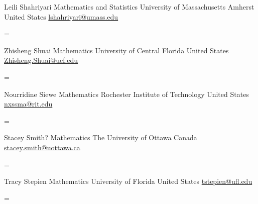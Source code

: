 \documentclass[
  letterpaper,
  DIV=11,
  numbers=noendperiod]{scrartcl}
\newenvironment{absolutelynopagebreak}
  {\par\nobreak\vfil\penalty0\vfilneg
   \vtop\bgroup}
  {\par\xdef\tpd{\the\prevdepth}\egroup
   \prevdepth=\tpd}
\begin{document}
\begin{absolutelynopagebreak}Leili   Shahriyari \newline
\mbox{}\quad  Mathematics and Statistics \newline
\mbox{}\quad  University of Massachusetts Amherst \newline
\mbox{}\quad  United States \newline
\mbox{}\quad \href{mailto: lshahriyari@umass.edu }{ lshahriyari@umass.edu }
\end{absolutelynopagebreak}\vskip0.2cm
\begin{absolutelynopagebreak}Zhisheng   Shuai \newline
\mbox{}\quad  Mathematics \newline
\mbox{}\quad  University of Central Florida \newline
\mbox{}\quad  United States \newline
\mbox{}\quad \href{mailto: Zhisheng.Shuai@ucf.edu }{ Zhisheng.Shuai@ucf.edu }
\end{absolutelynopagebreak}\vskip0.2cm
\begin{absolutelynopagebreak}Nourridine   Siewe \newline
\mbox{}\quad  Mathematics \newline
\mbox{}\quad  Rochester Institute of Technology \newline
\mbox{}\quad  United States \newline
\mbox{}\quad \href{mailto: nxssma@rit.edu }{ nxssma@rit.edu }
\end{absolutelynopagebreak}\vskip0.2cm
\begin{absolutelynopagebreak}Stacey   Smith? \newline
\mbox{}\quad  Mathematics \newline
\mbox{}\quad  The University of Ottawa \newline
\mbox{}\quad  Canada \newline
\mbox{}\quad \href{mailto: stacey.smith@uottawa.ca }{ stacey.smith@uottawa.ca }
\end{absolutelynopagebreak}\vskip0.2cm
\begin{absolutelynopagebreak}Tracy   Stepien \newline
\mbox{}\quad  Mathematics \newline
\mbox{}\quad  University of Florida \newline
\mbox{}\quad  United States \newline
\mbox{}\quad \href{mailto: tstepien@ufl.edu }{ tstepien@ufl.edu }
\end{absolutelynopagebreak}\vskip0.2cm
\end{document}
